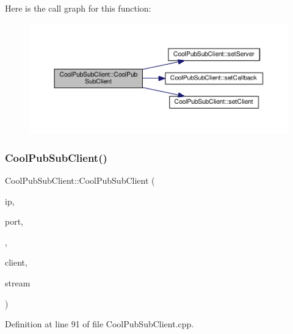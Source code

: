 Here is the call graph for this function\+:
\nopagebreak
\begin{figure}[H]
\begin{center}
\leavevmode
\includegraphics[width=350pt]{class_cool_pub_sub_client_afc703702b40ba925377d0b9cd401319e_cgraph}
\end{center}
\end{figure}
\mbox{\label{class_cool_pub_sub_client_a08309a2cf058099fa5c96c198f777647}} 
\subsubsection{\texorpdfstring{Cool\+Pub\+Sub\+Client()}{CoolPubSubClient()}\hspace{0.1cm}{\footnotesize\ttfamily [10/14]}}
{\footnotesize\ttfamily Cool\+Pub\+Sub\+Client\+::\+Cool\+Pub\+Sub\+Client (\begin{DoxyParamCaption}\item[{uint8\+\_\+t $\ast$}]{ip,  }\item[{uint16\+\_\+t}]{port,  }\item[{\hyperlink{class_cool_pub_sub_client_a021ec75e9fbaf658370b8005ccfddc14}{M\+Q\+T\+T\+\_\+\+C\+A\+L\+L\+B\+A\+C\+K\+\_\+\+S\+I\+G\+N\+A\+T\+U\+RE}}]{,  }\item[{Client \&}]{client,  }\item[{Stream \&}]{stream }\end{DoxyParamCaption})}



Definition at line 91 of file Cool\+Pub\+Sub\+Client.\+cpp.

